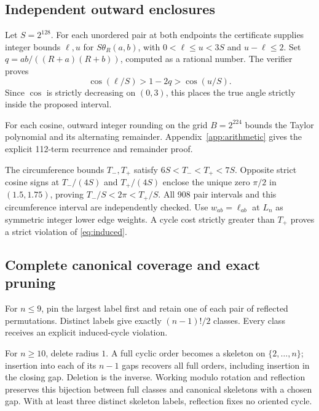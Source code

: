 \documentclass[11pt]{article}
\theoremstyle{definition}
\theoremstyle{remark}
\begin{document}
\subsection{Independent outward enclosures}
Let $S=2^{128}$. For each unordered pair at both endpoints the certificate
supplies integer bounds $\ell,u$ for $S\theta_R(a,b)$, with
$0<\ell\le u<3S$ and $u-\ell\le2$. Set
$q=ab/((R+a)(R+b))$, computed as a rational number. The verifier proves
\begin{equation}\label{eq:coscheck}
 \cos(\ell/S)>1-2q>\cos(u/S).
\end{equation}
Since $\cos$ is strictly decreasing on $(0,3)$, this places the true
angle strictly inside the proposed interval.

For each cosine, outward integer rounding on the grid $B=2^{224}$ bounds
the Taylor polynomial and its alternating remainder. Appendix~\ref{app:arithmetic}
gives the explicit 112-term recurrence and remainder proof.

The circumference bounds $T_-,T_+$ satisfy $6S<T_-<T_+<7S$.
Opposite strict cosine signs at $T_-/(4S)$ and $T_+/(4S)$ enclose
the unique zero $\pi/2$ in $(1.5,1.75)$, proving
$T_-/S<2\pi<T_+/S$. All 908 pair intervals and this circumference
interval are independently checked. Use $w_{ab}=\ell_{ab}$ at $L_n$
as symmetric integer lower edge weights. A cycle cost strictly greater
than $T_+$ proves a strict violation of \eqref{eq:induced}.

\subsection{Complete canonical coverage and exact pruning}
For $n\le9$, pin the largest label first and retain one of each pair of
reflected permutations. Distinct labels give exactly $(n-1)!/2$ classes.
Every class receives an explicit induced-cycle violation.

For $n\ge10$, delete radius $1$. A full cyclic order becomes a skeleton
on $\{2,\ldots,n\}$; insertion into each of its $n-1$ gaps recovers
all full orders, including insertion in the closing gap. Deletion is the
inverse. Working modulo rotation and reflection preserves this bijection
between full classes and canonical skeletons with a chosen gap. With at
least three distinct skeleton labels, reflection fixes no oriented cycle.
\end{document}
